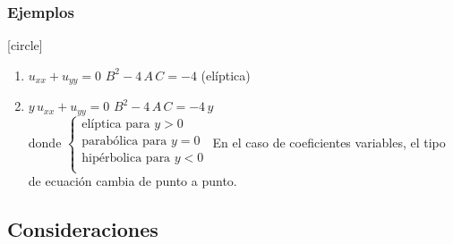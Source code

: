\documentclass[12pt]{beamer}
\begin{document}
\begin{frame}
\frametitle{Ejemplos}
[circle]
\begin{enumerate}[<+->]
\setlength\itemsep{1em}
\conti
\item $u_{xx} + u_{yy} = 0$ \hspace{1cm} $B^{2} - 4 \, A \, C = -4$ \hspace{0.6cm} (elíptica)
\item $y \, u_{xx} + u_{yy} = 0$ \hspace{0.6cm} $B^{2} - 4 \, A \, C = - 4 \, y$ \pause
\\
donde $\begin{cases}
\mbox{elíptica para } y > 0 \\
\mbox{parabólica para } y = 0 \\
\mbox{hipérbolica para } y < 0 \\
\end{cases}$
\newline
En el caso de coeficientes variables, el tipo de ecuación cambia de punto a punto.
\end{enumerate}
\end{frame}

\subsection*{Consideraciones}
\end{document}
